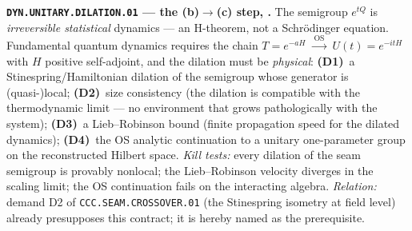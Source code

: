 \par\smallskip\noindent\textbf{\texttt{DYN.UNITARY.DILATION.01} --- the (b)$\to$(c) step,
\mO.}  The semigroup $e^{tQ}$ is \emph{irreversible statistical} dynamics --- an H-theorem, not
a Schr\"odinger equation.  Fundamental quantum dynamics requires the chain
$T=e^{-aH}\;\xrightarrow{\ \mathrm{OS}\ }\;U(t)=e^{-itH}$ with $H$ positive self-adjoint, and
the dilation must be \emph{physical}: \textbf{(D1)}~a Stinespring/Hamiltonian dilation of the
semigroup whose generator is (quasi-)local; \textbf{(D2)}~size consistency (the dilation is
compatible with the thermodynamic limit --- no environment that grows pathologically with the
system); \textbf{(D3)}~a Lieb--Robinson bound (finite propagation speed for the dilated
dynamics); \textbf{(D4)}~the OS analytic continuation to a unitary one-parameter group on the
reconstructed Hilbert space.  \emph{Kill tests:} every dilation of the seam semigroup is
provably nonlocal; the Lieb--Robinson velocity diverges in the scaling limit; the OS
continuation fails on the interacting algebra.  \emph{Relation:} demand D2 of
\texttt{CCC.SEAM.CROSSOVER.01} (the Stinespring isometry at field level) already presupposes
this contract; it is hereby named as the prerequisite.

